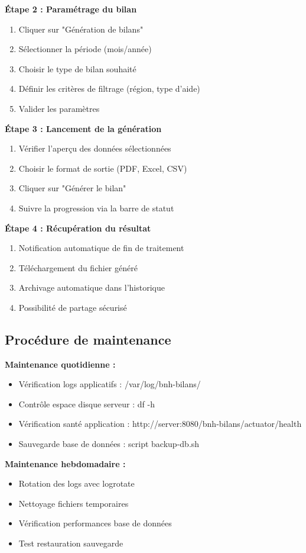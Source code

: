 \textbf{Étape 2 : Paramétrage du bilan}
\begin{enumerate}
    \item Cliquer sur "Génération de bilans"
    \item Sélectionner la période (mois/année)
    \item Choisir le type de bilan souhaité
    \item Définir les critères de filtrage (région, type d'aide)
    \item Valider les paramètres
\end{enumerate}

\textbf{Étape 3 : Lancement de la génération}
\begin{enumerate}
    \item Vérifier l'aperçu des données sélectionnées
    \item Choisir le format de sortie (PDF, Excel, CSV)
    \item Cliquer sur "Générer le bilan"
    \item Suivre la progression via la barre de statut
\end{enumerate}

\textbf{Étape 4 : Récupération du résultat}
\begin{enumerate}
    \item Notification automatique de fin de traitement
    \item Téléchargement du fichier généré
    \item Archivage automatique dans l'historique
    \item Possibilité de partage sécurisé
\end{enumerate}

\subsection{Procédure de maintenance}

\textbf{Maintenance quotidienne :}
\begin{itemize}
    \item Vérification logs applicatifs : /var/log/bnh-bilans/
    \item Contrôle espace disque serveur : df -h
    \item Vérification santé application : http://server:8080/bnh-bilans/actuator/health
    \item Sauvegarde base de données : script backup-db.sh
\end{itemize}

\textbf{Maintenance hebdomadaire :}
\begin{itemize}
    \item Rotation des logs avec logrotate
    \item Nettoyage fichiers temporaires
    \item Vérification performances base de données
    \item Test restauration sauvegarde
\end{itemize}

